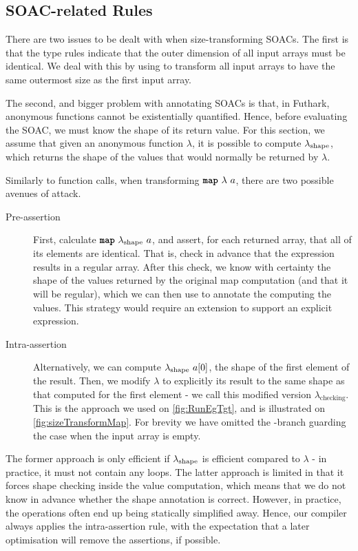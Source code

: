 \subsection{SOAC-related Rules}
\label{sec:SOACSizeRules}

There are two issues to be dealt with when size-transforming SOACs.
The first is that the type rules indicate that the outer dimension of
all input arrays must be identical.  We deal with this by using
 to transform all input arrays to have the same outermost
size as the first input array.

The second, and bigger problem with annotating SOACs is that, in
Futhark, anonymous functions cannot be existentially quantified.
Hence, before evaluating the SOAC, we must know the shape of its
return value.  For this section, we assume that given an anonymous
function \(\lambda\), it is possible to compute \(\lambda_{\textrm{shape}}\),
which returns the shape of the values that would normally be returned
by \(\lambda\).

Similarly to function calls, when transforming $\mbox{\texttt{\bfseries{map}}}~\lambda~a$,
there are two possible avenues of attack.

\begin{description}
\item[Pre-assertion] First, calculate $\mbox{\texttt{\bfseries{map}}}~\lambda_{\textrm{shape}}~a$, and
  assert, for each returned array, that all of its elements are
  identical. That is, check in advance that the  expression
  results in a regular array.  After this check, we know with
  certainty the shape of the values returned by the original map
  computation (and that it will be regular), which we can then use to
  annotate the  computing the values.  This strategy would
  require an extension to support an explicit  expression.

\item[Intra-assertion] Alternatively, we can compute
  \(\lambda_{\textrm{shape}}~a[0]\), the shape of the first element of the
  result.  Then, we modify $\lambda$ to explicitly  its
  result to the same shape as that computed for the first element - we
  call this modified version \(\lambda_{\textrm{checking}}\).  This is
  the approach we used on \cref{fig:RunEgTgt}, and is illustrated on
  \cref{fig:sizeTransformMap}.  For brevity we have omitted the
  -branch guarding the case when the input array is empty.
\end{description}

The former approach is only efficient if \(\lambda_{\text{\textrm{shape}}}\)
is efficient compared to \(\lambda\) - in practice, it must not
contain any loops.  The latter approach is limited in that it forces
shape checking inside the value computation, which means that we do
not know in advance whether the shape annotation is correct.  However,
in practice, the  operations often end up being statically
simplified away.  Hence, our compiler always applies the
intra-assertion rule, with the expectation that a later optimisation
will remove the assertions, if possible.

